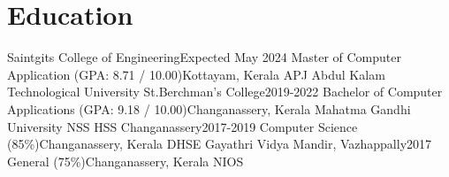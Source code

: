 \section{Education}
    \resumeSubHeadingListStart

    \resumeEducationSubheading
    {Saintgits College of Engineering}{Expected May 2024}
    {Master of Computer Application (GPA: 8.71 / 10.00)}{Kottayam, Kerala}
    {APJ Abdul Kalam Technological University}
    \resumeEducationSubheading
    {St.Berchman's College}{2019-2022}
    {Bachelor of Computer Applications (GPA: 9.18 / 10.00)}{Changanassery, Kerala}
    {Mahatma Gandhi University}
    \resumeEducationSubheading
    {NSS HSS Changanassery}{2017-2019}
    {Computer Science (85\%)}{Changanassery, Kerala}
    {DHSE}
    \resumeEducationSubheading
    {Gayathri Vidya Mandir, Vazhappally}{2017}
    {General (75\%)}{Changanassery, Kerala}
    {NIOS}


    \resumeSubHeadingListEnd